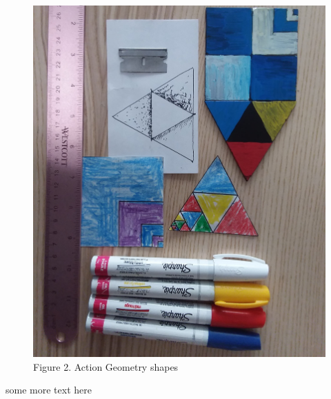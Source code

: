 \documentclass[11pt]{article}
\begin{document}
\begin{figure}
    
\includegraphics[width=\linewidth]{../figures/UKPyX8c.jpg}

    \caption{Figure 2. Action Geometry shapes}
\end{figure}





some more text here
\end{document}
